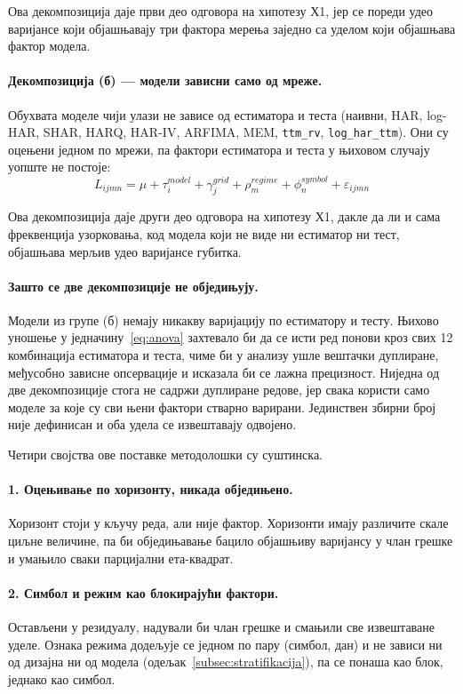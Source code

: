 Ова декомпозиција даје први део одговора на хипотезу Х1, јер се пореди удео варијансе који
објашњавају три фактора мерења заједно са уделом који објашњава фактор модела.

\paragraph{Декомпозиција (б) — модели зависни само од мреже.}
Обухвата моделе чији улази не зависе од естиматора и теста (наивни, HAR, log-HAR,
SHAR, HARQ, HAR-IV, ARFIMA, MEM, \texttt{ttm\_rv}, \texttt{log\_har\_ttm}). Они су
оцењени једном по мрежи, па фактори естиматора и теста у њиховом случају уопште не
постоје:
\begin{equation}
L_{ijmn} = \mu + \tau_i^{model} + \gamma_j^{grid} + \rho_m^{regime}
+ \phi_n^{symbol} + \varepsilon_{ijmn}
\end{equation}

Ова декомпозиција даје други део одговора на хипотезу Х1, дакле да ли и сама фреквенција
узорковања, код модела који не виде ни естиматор ни тест, објашњава мерљив удео
варијансе губитка.

\paragraph{Зашто се две декомпозиције не обједињују.}
Модели из групе (б) немају никакву варијацију по естиматору и тесту. Њихово уношење у
једначину~\eqref{eq:anova} захтевало би да се исти ред понови кроз свих 12
комбинација естиматора и теста, чиме би у анализу ушле вештачки дуплиране, међусобно
зависне опсервације и исказала би се лажна прецизност. Ниједна од две декомпозиције
стога не садржи дуплиране редове, јер свака користи само моделе за које су сви њени
фактори стварно варирани. Јединствен збирни број није дефинисан и оба удела се
извештавају одвојено.

Четири својства ове поставке методолошки су суштинска.

\paragraph{1. Оцењивање по хоризонту, никада обједињено.}
Хоризонт стоји у кључу реда, али није фактор. Хоризонти имају различите скале циљне
величине, па би обједињавање бацило објашњиву варијансу у члан грешке и умањило сваки
парцијални ета-квадрат.

\paragraph{2. Симбол и режим као блокирајући фактори.}
Остављени у резидуалу, надували би члан грешке и смањили све извештаване уделе. Ознака
режима додељује се једном по пару (симбол, дан) и не зависи ни од дизајна ни од модела
(одељак~\ref{subsec:stratifikacija}), па се понаша као блок, једнако као симбол.

